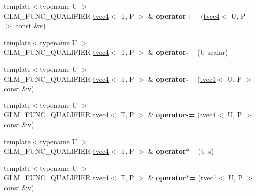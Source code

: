 \begin{DoxyCompactItemize}
\item 
\hypertarget{structglm_1_1tvec4_a7f4b03466df6bcba831d4cfac6df8405}{{\footnotesize template$<$typename U $>$ }\\G\-L\-M\-\_\-\-F\-U\-N\-C\-\_\-\-Q\-U\-A\-L\-I\-F\-I\-E\-R \hyperlink{structglm_1_1tvec4}{tvec4}$<$ T, P $>$ \& {\bfseries operator+=} (\hyperlink{structglm_1_1tvec4}{tvec4}$<$ U, P $>$ const \&v)}\label{structglm_1_1tvec4_a7f4b03466df6bcba831d4cfac6df8405}

\item 
\hypertarget{structglm_1_1tvec4_aa293b1a9e9bfc9d9a3700a821a39cc23}{{\footnotesize template$<$typename U $>$ }\\G\-L\-M\-\_\-\-F\-U\-N\-C\-\_\-\-Q\-U\-A\-L\-I\-F\-I\-E\-R \hyperlink{structglm_1_1tvec4}{tvec4}$<$ T, P $>$ \& {\bfseries operator-\/=} (U scalar)}\label{structglm_1_1tvec4_aa293b1a9e9bfc9d9a3700a821a39cc23}

\item 
\hypertarget{structglm_1_1tvec4_a1cb06bb90bd33c7cf2c8a2a97484af56}{{\footnotesize template$<$typename U $>$ }\\G\-L\-M\-\_\-\-F\-U\-N\-C\-\_\-\-Q\-U\-A\-L\-I\-F\-I\-E\-R \hyperlink{structglm_1_1tvec4}{tvec4}$<$ T, P $>$ \& {\bfseries operator-\/=} (\hyperlink{structglm_1_1tvec1}{tvec1}$<$ U, P $>$ const \&v)}\label{structglm_1_1tvec4_a1cb06bb90bd33c7cf2c8a2a97484af56}

\item 
\hypertarget{structglm_1_1tvec4_a75d65a025aeea5e7351d8c0113fabebb}{{\footnotesize template$<$typename U $>$ }\\G\-L\-M\-\_\-\-F\-U\-N\-C\-\_\-\-Q\-U\-A\-L\-I\-F\-I\-E\-R \hyperlink{structglm_1_1tvec4}{tvec4}$<$ T, P $>$ \& {\bfseries operator-\/=} (\hyperlink{structglm_1_1tvec4}{tvec4}$<$ U, P $>$ const \&v)}\label{structglm_1_1tvec4_a75d65a025aeea5e7351d8c0113fabebb}

\item 
\hypertarget{structglm_1_1tvec4_a5d0345b2430e4a425edc29dfb2e0d1a7}{{\footnotesize template$<$typename U $>$ }\\G\-L\-M\-\_\-\-F\-U\-N\-C\-\_\-\-Q\-U\-A\-L\-I\-F\-I\-E\-R \hyperlink{structglm_1_1tvec4}{tvec4}$<$ T, P $>$ \& {\bfseries operator$\ast$=} (U s)}\label{structglm_1_1tvec4_a5d0345b2430e4a425edc29dfb2e0d1a7}

\item 
\hypertarget{structglm_1_1tvec4_ab88c27f3115f0fa7593fccf3d896779b}{{\footnotesize template$<$typename U $>$ }\\G\-L\-M\-\_\-\-F\-U\-N\-C\-\_\-\-Q\-U\-A\-L\-I\-F\-I\-E\-R \hyperlink{structglm_1_1tvec4}{tvec4}$<$ T, P $>$ \& {\bfseries operator$\ast$=} (\hyperlink{structglm_1_1tvec1}{tvec1}$<$ U, P $>$ const \&v)}\label{structglm_1_1tvec4_ab88c27f3115f0fa7593fccf3d896779b}


\end{DoxyCompactItemize}
